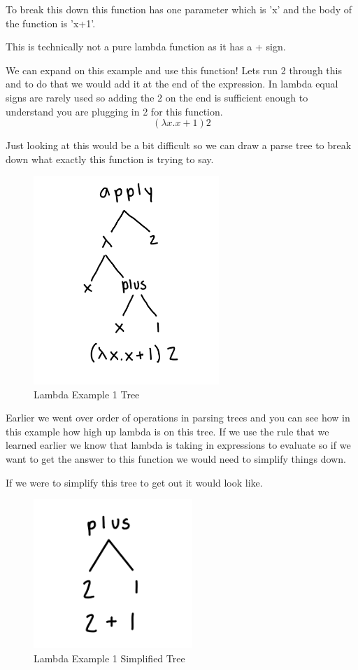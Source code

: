 \documentclass{article}
\begin{document}
\medskip\noindent
To break this down this function has one parameter which is 'x' and the body of the function is 'x+1'.

\medskip\noindent
This is technically not a pure lambda function as it has a + sign. 

\medskip\noindent
We can expand on this example and use this function! Lets run 2 through this and to do that we would add it at the end of the expression. In lambda equal signs are rarely used so adding the 2 on the end is sufficient enough to understand you are plugging in 2 for this function.
$$ (\lambda x.x+1)2$$

\medskip\noindent
Just looking at this would be a bit difficult so we can draw a parse tree to break down what exactly this function is trying to say.

\medskip\noindent 
\begin{figure}[htp]
    \centering
    \includegraphics[width=7cm]{lambdaExample1.jpg}
    \caption{Lambda Example 1 Tree}
    \label{fig:Lambda Example Tree}
\end{figure}

\medskip\noindent
Earlier we went over order of operations in parsing trees and you can see how in this example how high up lambda is on this tree. If we use the rule that we learned earlier we know that lambda is taking in expressions to evaluate so if we want to get the answer to this function we would need to simplify things down.

\medskip\noindent
If we were to simplify this tree to get out it would look like.

\medskip\noindent 
\begin{figure}[htp]
    \centering
    \includegraphics[width=6cm]{IMG_0676.jpg}
    \caption{Lambda Example 1 Simplified Tree}
    \label{fig:Lambda Example Tree Simplified}
\end{figure}
\end{document}
